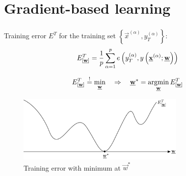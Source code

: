 \section{Gradient-based learning}

\begin{frame}\frametitle{\secname}
	Training error $E^T$ for the training set $\left\{\vec x^{(\alpha)}, y^{(\alpha)}_{T}\right\}$: 
    \begin{equation}
        {E}^T_{[\underline{\mathbf{w}}]} = \frac{1}{p} \sum\limits_{\alpha = 1}^p 
					e\left(y^{(\alpha)}_T, y\left(\underline{\mathbf{x}}^{(\alpha)}; \underline{\mathbf{w}}\right)\right)
    \end{equation}
    
    
    \begin{equation}
        \ETw \eqexcl \min_{\vec w} \quad \Rightarrow \quad \vec w^{*} = \argmin_{\vec w} \ETw
    \end{equation}

    \begin{figure}[h]
        \centering
        \includegraphics[height=3.25cm]{img/section1_fig19_no_steps}
        \caption{Training error with minimum at $\vec w^{*}$}
        \label{fig:training_error} 
    \end{figure}
    
    \pause 
    
    

    
    
\end{frame}

